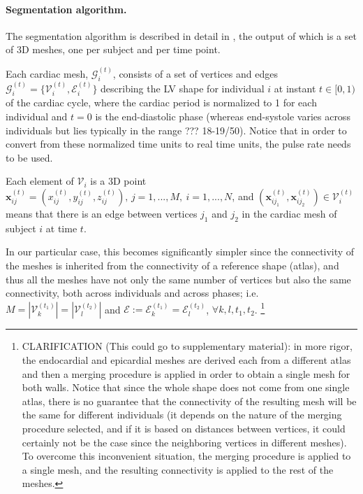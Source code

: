 \documentclass[twocolumn]{llncs}
\begin{document}
\paragraph{Segmentation algorithm.}
The segmentation algorithm is described in detail in \cite{ref_rahman}, the output of which is a set of 3D meshes, one per subject and per time point. 

Each cardiac mesh, $\mathcal{G}_{i}^{(t)}$, consists of a set of vertices and edges $\mathcal{G}_{i}^{(t)}=\{\mathcal{V}_{i}^{(t)}, \mathcal{E}_{i}^{(t)}\}$ describing the LV shape for individual $i$ at instant $t\in[0,1)$ of the cardiac cycle, where the cardiac period is normalized to 1 for each individual and $t=0$ is the end-diastolic phase (whereas end-systole varies across individuals but lies typically in the range ??? 18-19/50). Notice that in order to convert from these normalized time units to real time units, the pulse rate needs to be used.

Each element of $\mathcal{V}_i$ is a 3D point $\textbf{x}_{ij}^{(t)}=(x_{ij}^{(t)}, y_{ij}^{(t)}, z_{ij}^{(t)}),\, j=1,...,M,\ i=1,...,N$, and $(\textbf{x}_{ij_1}^{(t)}, \textbf{x}_{ij_2}^{(t)})\in\mathcal{V}_i^{(t)}$ means that there is an edge between vertices $j_1$ and $j_2$ in the cardiac mesh of subject $i$ at time $t$.

In our particular case, this becomes significantly simpler since the connectivity of the meshes is inherited from the connectivity of a reference shape (atlas), and thus all the meshes have not only the same number of vertices but also the same connectivity, both across individuals and across phases; i.e. $M=|\mathcal{V}_k^{(t_1)}|=|\mathcal{V}_l^{(t_2)}|$ and $
\mathcal{E}:=\mathcal{E}_{k}^{(t_1)}=\mathcal{E}_{l}^{(t_2)}$, $\forall k, l, t_1, t_2$.
\footnote{CLARIFICATION (This could go to supplementary material): in more rigor, the endocardial and epicardial meshes are derived each from a different atlas and then a merging procedure is applied in order to obtain a single mesh for both walls. Notice that since the whole shape does not come from one single atlas, there is no guarantee that the connectivity of the resulting mesh will be the same for different individuals (it depends on the nature of the merging procedure selected, and if it is based on distances between vertices, it could certainly not be the case since the neighboring vertices in different meshes). To overcome this inconvenient situation, the merging procedure is applied to a single mesh, and the resulting connectivity is applied to the rest of the meshes.}
\end{document}
